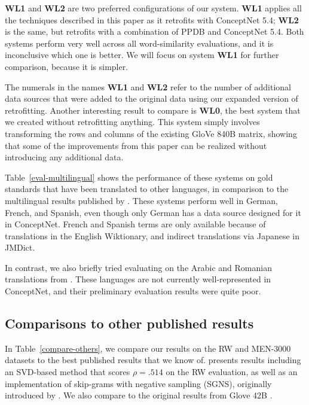 \documentclass[letterpaper]{article}
\begin{document}
{\bf WL1} and {\bf WL2} are two preferred configurations of our system. {\bf WL1}
applies all the techniques described in this paper as it retrofits with
ConceptNet 5.4; {\bf WL2} is the same, but retrofits with a combination of PPDB and
ConceptNet 5.4. Both systems perform very well across all word-similarity
evaluations, and it is inconclusive which one is better. We will focus on
system {\bf WL1} for further comparison, because it is simpler.

The numerals in the names {\bf WL1} and {\bf WL2} refer to the number of
additional data sources that were added to the original data using our expanded
version of retrofitting. Another interesting result to compare is {\bf WL0},
the best system that we created without retrofitting anything. This system
simply involves transforming the rows and columns of the existing GloVe 840B
matrix, showing that some of the improvements from this paper can be realized
without introducing any additional data.

Table~\ref{eval-multilingual} shows the performance of these systems on
gold standards that have been translated to other languages, in comparison to
the multilingual results published by .
These systems perform well in German, French, and Spanish, even though only
German has a data source designed for it in ConceptNet. French and Spanish terms
are only available because of translations in the English Wiktionary, and
indirect translations via Japanese in JMDict.

In contrast, we also briefly tried evaluating on the Arabic and Romanian
translations from . These languages are not
currently well-represented in ConceptNet, and their preliminary evaluation
results were quite poor.

\subsection{Comparisons to other published results}

In Table~\ref{compare-others}, we compare our results on the RW and MEN-3000
datasets to the best published results that we know of.
 presents results including an SVD-based method
that scores $\rho = .514$ on the RW evaluation, as well as an implementation
of skip-grams with negative sampling (SGNS), originally introduced by
. We also compare to the original results from
Glove 42B \cite{pennington2014glove}.
\end{document}
